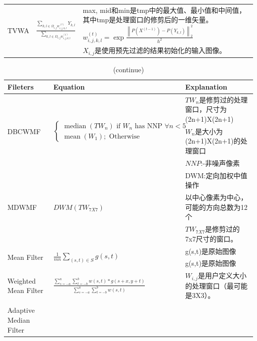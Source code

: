 \documentclass[12pt]{article} %
\begin{document}
\begin{table}[]
\begin{tabular}{@{}p{3cm}lp{8cm}@{}}
     \\
     \multirow{3}{*}{TVWA} &
    \multirow{3}{*}{ $\frac{\sum_{k, l \in \Omega_{i, j} w_{i, j, k, l}^{(t)}} Y_{k, l}}{\sum_{k, l \in \Omega_{i, j} w_{i, j, k, l}^{(t)}}}$ }&
     max, mid和min是tmp中的最大值、最小值和中间值，其中tmp是处理窗口的修剪后的一维矢量。$w_{i, j, k, l}^{(t)}=\exp \frac{\left\|P\left(X^{(t-1)}\right)-P\left(Y_{k, l}\right)\right\|_2^2}{h^2}$\\
     ~ & ~ & $X_{i,j}$是使用预先过滤的结果初始化的输入图像。\\
     \midrule
    \end{tabular}
    \label{table1}
\end{table}

\begin{table}[t]
    \small
    \caption{(continue)}
    \begin{tabular}{@{}p{4cm}lp{6cm}@{}}
    \toprule
    Fileters & Equation & Explanation \\ 
    \midrule
    \multirow{3}{*}{DBCWMF} &
    \multirow{3}{*}{$\left\{\begin{array}{l}\operatorname{median}\left(T W_n\right) \text { if } W_n \text { has NNP } \forall n<5 \\ \operatorname{mean}\left(W_1\right) ; \text { Otherwise }\end{array}\right.$} &
        $TW_n$是修剪过的处理窗口，尺寸为(2n+1)X(2n+1)\\
      ~ & ~ & $W_n$是大小为(2n+1)X(2n+1)的处理窗口 \\
      ~ & ~ & $NNP$:-非噪声像素
      \\ 
    \multirow{3}{*}{MDWMF} &
    \multirow{3}{*}{$DWM(TW_{7X7})$} &
               DWM:定向加权中值操作\\
      ~ & ~ &  以中心像素为中心，可能的方向总数为12个\\
      ~ & ~ &  $TW_{7X7}$是修剪过的7x7尺寸的窗口。
      \\
    \multirow{2}{*}{Mean Filter} &
    \multirow{2}{*}{$\frac{1}{m n} \sum_{(s, t) \in S} g(s, t)$} &
              g(s,t)是原始图像\\
      ~ & ~ & g(s,t)是原始图像
      \\
    \multirow{1}{*}{Weighted Mean Filter} &
    \multirow{1}{*}{$\frac{\sum_{s=-a}^a \sum_{t=-b}^b w(s, t) * g(s+x, y+t)}{\sum_{s=-a}^a \sum_{t=-b}^b w(s, t)}$} &
              $W_{i,j}$是用户定义大小的处理窗口（最可能是3X3）。\\
      \\
    \multirow{1}{*}{Adaptive Median Filter} &

\end{tabular}
\end{table}
\end{document}
